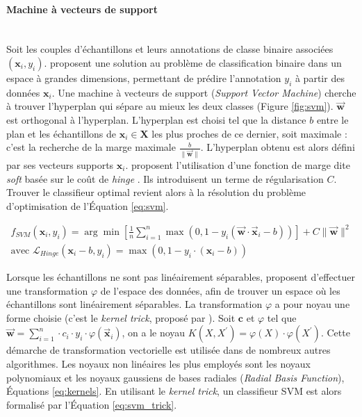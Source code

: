 \paragraph{Machine à vecteurs de support}\mbox{\label{parag:svm}} \\
Soit les couples d'échantillons et leurs annotations de classe binaire associées $(\mathbf{x}_i, y_i)$.
\citeauthor{vapnik_patterns_1963} \cite{vapnik_patterns_1963} proposent une solution au problème de classification binaire dans un espace à grandes dimensions, permettant de prédire l'annotation $y_i$ à partir des données $\mathbf{x}_i$.
Une machine à vecteurs de support (\textit{Support Vector Machine}) cherche à trouver l'hyperplan qui sépare au mieux les deux classes (Figure \ref{fig:svm}). $\vec{\mathbf{w}}$  est orthogonal à l'hyperplan.
L'hyperplan est choisi tel que la distance $b$ entre le plan et les échantillons de $\mathbf{x}_i \in \mathbf{X}$ les plus proches de ce dernier, soit maximale : c'est la recherche de la marge maximale $\frac{b}{\|\vec{\mathbf{w}}\|}$.
L'hyperplan obtenu est alors défini par ses vecteurs supports $\mathbf{x}_i$.
\citeauthor{cortes_supportvector_1995} proposent l'utilisation d'une fonction de marge dite \textit{soft} basée sur le coût de \textit{hinge} \cite{cortes_supportvector_1995, vapnik_support_1997}.
Ils introduisent un terme de régularisation $C$. Trouver le classifieur optimal revient alors à la résolution du problème d'optimisation de l'Équation \ref{eq:svm}.

\begin{equation} \label{eq:svm}
\begin{split}
f_{SVM}(\mathbf{x}_i, y_i) = \arg \min \left[\frac{1}{n} \sum_{i=1}^{n} \max \left(0, 1-y_{i}\left(\vec{\mathbf{w}} \cdot \vec{\mathbf{x}}_{i}-b\right)\right)\right]+ C \|\vec{\mathbf{w}}\|^{2}
\\
\text{avec } \mathcal{L}_{Hinge}(\mathbf{x}_i-b, y_i) = \max (0, 1 - y_i \cdot (\mathbf{x}_i-b))
\end{split}
\end{equation}

Lorsque les échantillons ne sont pas linéairement séparables, \citeauthor{boser_training_1992} \cite{boser_training_1992} proposent d'effectuer une transformation $\varphi$ de l'espace des données, afin de trouver un espace où les échantillons sont linéairement séparables.
La transformation $\varphi$ a pour noyau une forme choisie (c'est le \textit{kernel trick}, proposé par \citeauthor{aizerman_theoretical_1964} \cite{aizerman_theoretical_1964}).
Soit $\mathbf{c}$ et $\varphi$ tel que $\vec{\mathbf{w}}=\sum_{i=1}^{n} \cdot c_{i} \cdot y_{i} \cdot \varphi\left(\vec{\mathbf{x}}_{i}\right)$, on a le noyau $K\left(X, X^{\prime}\right) = \varphi \left(X\right) \cdot \varphi\left(X^{\prime}\right)$.
Cette démarche de transformation vectorielle est utilisée dans de nombreux autres algorithmes.
Les noyaux non linéaires les plus employés sont les noyaux polynomiaux et les noyaux gaussiens de bases radiales (\textit{Radial Basis Function}), Équations \ref{eq:kernels}.
En utilisant le \textit{kernel trick}, un classifieur SVM est alors formalisé par l'Équation \ref{eq:svm_trick}.

